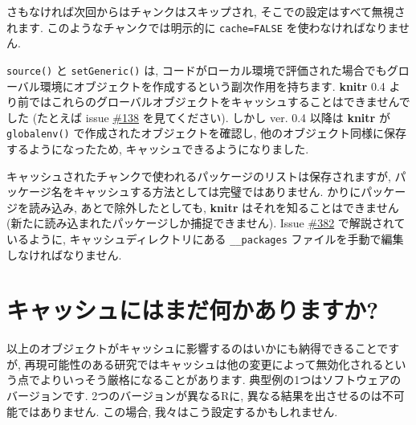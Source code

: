 \documentclass[
]{bxjsreport}
\newenvironment{Shaded}{\begin{snugshade}}{\end{snugshade}}
\newcommand{\AttributeTok}[1]{\textcolor[rgb]{0.77,0.63,0.00}{#1}}
\newcommand{\CommentTok}[1]{\textcolor[rgb]{0.56,0.35,0.01}{\textit{#1}}}
\newcommand{\FunctionTok}[1]{\textcolor[rgb]{0.00,0.00,0.00}{#1}}
\newcommand{\NormalTok}[1]{#1}
\newcommand{\SpecialCharTok}[1]{\textcolor[rgb]{0.00,0.00,0.00}{#1}}
\begin{document}
さもなければ次回からはチャンクはスキップされ,
そこでの設定はすべて無視されます. このようなチャンクでは明示的に
\texttt{cache=FALSE} を使わなければなりません.

\texttt{source()} と \texttt{setGeneric()} は,
コードがローカル環境で評価された場合でもグローバル環境にオブジェクトを作成するという副次作用を持ちます.
\textbf{knitr} 0.4
より前ではこれらのグローバルオブジェクトをキャッシュすることはできませんでした
(たとえば issue \href{https://github.com/yihui/knitr/issues/138}{\#138}
を見てください). しかし ver. 0.4 以降は \textbf{knitr} が
\texttt{globalenv()} で作成されたオブジェクトを確認し,
他のオブジェクト同様に保存するようになったため,
キャッシュできるようになりました.

キャッシュされたチャンクで使われるパッケージのリストは保存されますが,
パッケージ名をキャッシュする方法としては完璧ではありません.
かりにパッケージを読み込み, あとで除外したとしても, \textbf{knitr}
はそれを知ることはできません
(新たに読み込まれたパッケージしか捕捉できません). Issue
\href{https://github.com/yihui/knitr/issues/382}{\#382}
で解説されているように, キャッシュディレクトリにある
\texttt{\_\_packages} ファイルを手動で編集しなければなりません.

\hypertarget{ux30adux30e3ux30c3ux30b7ux30e5ux306bux306fux307eux3060ux4f55ux304bux3042ux308aux307eux3059ux304b}{%
\section*{キャッシュにはまだ何かありますか?}\label{ux30adux30e3ux30c3ux30b7ux30e5ux306bux306fux307eux3060ux4f55ux304bux3042ux308aux307eux3059ux304b}}

以上のオブジェクトがキャッシュに影響するのはいかにも納得できることですが,
再現可能性のある研究ではキャッシュは他の変更によって無効化されるという点でよりいっそう厳格になることがあります.
典型例の1つはソフトウェアのバージョンです. 2つのバージョンが異なるRに,
異なる結果を出させるのは不可能ではありません. この場合,
我々はこう設定するかもしれません.

\begin{Shaded}
\end{Shaded}
\end{document}
